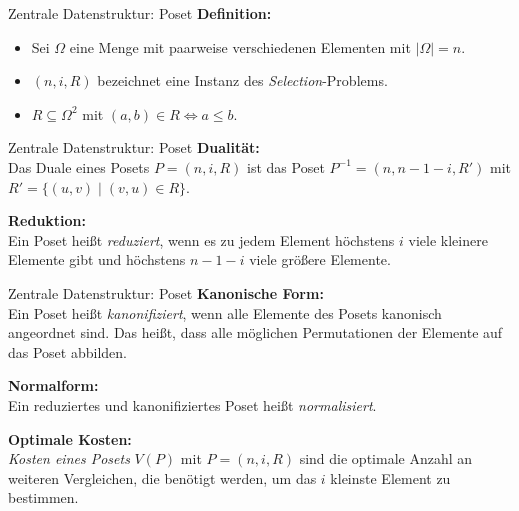 \begin{frame}{Zentrale Datenstruktur: Poset}
  \textbf{Definition:}
  \vspace{1mm}
  \begin{itemize}
    \item Sei $\Omega$ eine Menge mit paarweise verschiedenen Elementen mit $\vert \Omega \vert = n$.
    \item $(n,i,R)$ bezeichnet eine Instanz des \textit{Selection}-Problems.
    \item $R \subseteq \Omega^2$ mit $(a,b) \in R \Leftrightarrow a \leq b$.
  \end{itemize}
  \vspace{2mm}
\end{frame}

\begin{frame}{Zentrale Datenstruktur: Poset}
  \textbf{Dualität:} \\
  \vspace{1mm}
  Das Duale eines Posets $P = (n, i, R)$ ist das Poset $P^{-1} = \left(n, n-1-i, R'\right)$ mit $R' = \{ (u,v) \; \vert \; (v,u) \in R\}$.

  \pause
  \vspace{2mm}
  \textbf{Reduktion:} \\
  \vspace{1mm}
  Ein Poset heißt \textit{reduziert}, wenn es zu jedem Element höchstens $i$ viele kleinere Elemente gibt und höchstens $n-1-i$ viele größere Elemente.
\end{frame}

\begin{frame}{Zentrale Datenstruktur: Poset}
  \textbf{Kanonische Form:} \\
  \vspace{1mm}
  Ein Poset heißt \textit{kanonifiziert}, wenn alle Elemente des Posets kanonisch angeordnet sind. Das heißt, dass alle möglichen Permutationen der Elemente auf das Poset abbilden.

  \pause
  \vspace{2mm}
  \textbf{Normalform:} \\
  \vspace{1mm}
  Ein reduziertes und kanonifiziertes Poset heißt \textit{normalisiert}.

  \pause
  \vspace{2mm}
  \textbf{Optimale Kosten:} \\
  \vspace{1mm}
  \textit{Kosten eines Posets} $V(P)$ mit $P=(n,i,R)$ sind die optimale Anzahl an weiteren Vergleichen, die benötigt werden, um das $i$ kleinste Element zu bestimmen.
\end{frame}

